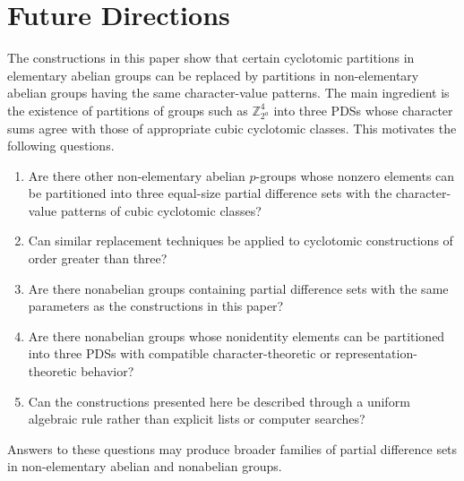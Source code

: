 \documentclass[11pt]{article}
\theoremstyle{definition}
\theoremstyle{remark}
\newcommand{\Z}{\mathbb{Z}}
\begin{document}


\section{Future Directions}

The constructions in this paper show that certain cyclotomic
partitions in elementary abelian groups can be replaced by partitions
in non-elementary abelian groups having the same character-value
patterns. The main ingredient is the existence of partitions of groups such as $\Z_{2^a}^4$ into three PDSs whose character sums agree with
those of appropriate cubic cyclotomic classes. This motivates the following questions.

\begin{enumerate}
    \item Are there other non-elementary abelian \(p\)-groups whose
    nonzero elements can be partitioned into three equal-size partial
    difference sets with the character-value patterns of cubic
    cyclotomic classes?

    \item Can similar replacement techniques be applied to
    cyclotomic constructions of order greater than three?

    \item Are there nonabelian groups containing partial difference
    sets with the same parameters as the constructions in this
    paper?

    \item Are there nonabelian groups whose nonidentity elements can
    be partitioned into three PDSs with compatible
    character-theoretic or representation-theoretic behavior?

    \item Can the constructions presented here be described through
    a uniform algebraic rule rather than explicit lists or computer
    searches?
\end{enumerate}

Answers to these questions may produce broader families of partial
difference sets in non-elementary abelian and nonabelian groups.
\end{document}
